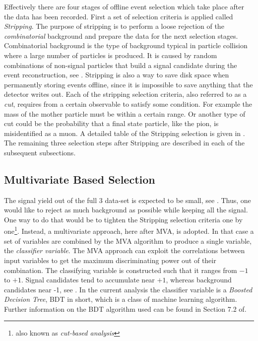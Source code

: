 
Effectively there are four stages of offline event selection which take place after the data has been recorded.
First a set of selection criteria is applied called {\it Stripping}. The purpose of stripping is to perform
a loose rejection of the {\it combinatorial} background and prepare the data for the next selection stages.
Combinatorial background is the type of background typical in particle collision where a large number of
particles is produced. It is caused by random combinations of non-signal particles that build a signal
candidate during the event reconstruction, see .
Stripping is also a way to save disk space when permanently storing events offline, since it is impossible to save anything
that the detector writes out. Each of the stripping selection criteria, also referred to as a {\it cut},
requires from a certain observable to satisfy some condition. For example the mass of the mother particle \Bs must be within
a certain range. Or another type of cut could be the probability that a final state particle, like the pion, is misidentified
as a muon. A detailed table of the Stripping selection is given in . The remaining three selection
steps after Stripping are described in each of the subsequent subsections.

\subsection{Multivariate Based Selection}
\label{Multivariate_Based_Selection}

The \BsJpsiKst signal yield out of the full 3 \invfb data-set is expected to be small, see . Thus, one would like to
reject as much background as possible while keeping all the signal. One way to do that would be to tighten the Stripping selection criteria
one by one\footnote{also known as {\it cut-based analysis}}. Instead, a multivariate approach, here after MVA, is adopted.
In that case a set of variables are combined by the MVA algorithm to produce a single variable, the {\it classifier variable}.
The MVA approach can exploit the correlations between input variables to get the maximum discriminating power out of their combination.
The classifying variable is constructed such that it ranges from $-1$ to $+1$. Signal candidates tend to accumulate near $+1$,
whereas background candidates near -1, see . In the current analysis the classifier variable is a
{\it Boosted Decision Tree}, BDT in short, which is a class of machine learning  algorithm. Further information
on the BDT algorithm used can be found in Section 7.2 of\cite{TMVA}.

